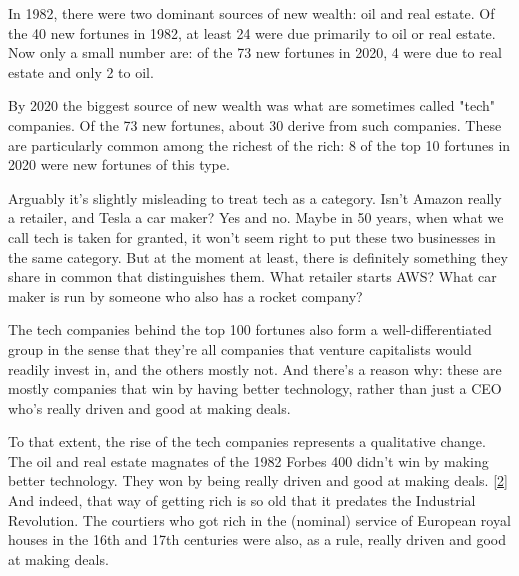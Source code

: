 In 1982, there were two dominant sources of
                  new wealth: oil and real estate. Of the 40 new fortunes in
                  1982, at least 24 were due primarily to oil or real estate.
                  Now only a small number are: of the 73 new fortunes in 2020, 4
                  were due to real estate and only 2 to oil.

By 2020
                  the biggest source of new wealth was what are sometimes called
                  "tech" companies. Of the 73 new fortunes, about 30 derive from
                  such companies. These are particularly common among the
                  richest of the rich: 8 of the top 10 fortunes in 2020 were new
                  fortunes of this type.

Arguably it's slightly
                  misleading to treat tech as a category. Isn't Amazon really a
                  retailer, and Tesla a car maker? Yes and no. Maybe in 50
                  years, when what we call tech is taken for granted, it won't
                  seem right to put these two businesses in the same category.
                  But at the moment at least, there is definitely something they
                  share in common that distinguishes them. What retailer starts
                  AWS? What car maker is run by someone who also has a rocket
                  company?

The tech companies behind the top 100
                  fortunes also form a well-differentiated group in the sense
                  that they're all companies that venture capitalists would
                  readily invest in, and the others mostly not. And there's a
                  reason why: these are mostly companies that win by having
                  better technology, rather than just a CEO who's really driven
                  and good at making deals.

To that extent, the rise
                  of the tech companies represents a qualitative change. The oil
                  and real estate magnates of the 1982 Forbes 400 didn't win by
                  making better technology. They won by being really driven and
                  good at making deals.
                  [\href{\#f2n}{2}]
                  And indeed, that way of getting rich is so old that it
                  predates the Industrial Revolution. The courtiers who got rich
                  in the (nominal) service of European royal houses in the 16th
                  and 17th centuries were also, as a rule, really driven and
                  good at making deals.

